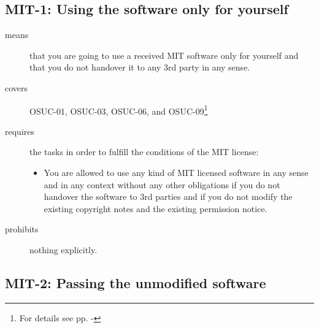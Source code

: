 \begin{center}
\begin{footnotesize}
{{{{{        }


      }
 
    }
   }   
}
\end{footnotesize}
\end{center}

\subsection{MIT-1: Using the software only for yourself}
\label{OSUC-01-MIT} 
\label{OSUC-03-MIT} 
\label{OSUC-06-MIT}
\label{OSUC-09-MIT}
  
\begin{description}
\item[means] that you are going to use a received MIT software only for yourself
and that you do not handover it to any 3rd party in any sense.
\item[covers] OSUC-01, OSUC-03, OSUC-06, and OSUC-09\footnote{For details see pp.
  \pageref{OSUC-01-DEF} - \pageref{OSUC-09-DEF}}
\item[requires] the tasks in order to fulfill the conditions
    of the MIT license:
  \begin{itemize}
    \item You are allowed to use any kind of MIT licensed software in any sense
    and in any context without any other obligations if you do not handover the
    software to 3rd parties and if you do not modify the existing copyright
    notes and the existing permission notice.
  \end{itemize}
\item[prohibits] nothing explicitly.
\end{description}

\subsection{MIT-2: Passing the unmodified software}
\label{OSUC-02-MIT} \label{OSUC-05-MIT} \label{OSUC-07-MIT} 

